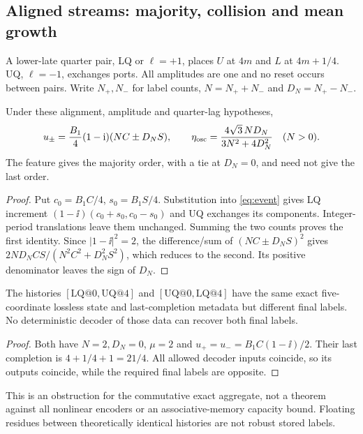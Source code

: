 \subsection{Aligned streams: majority, collision and mean growth}
A lower-late quarter pair, LQ or $\ell=+1$, places $U$ at $4m$ and $L$ at $4m+1/4$. UQ, $\ell=-1$, exchanges ports. All amplitudes are one and no reset occurs between pairs. Write $N_+,N_-$ for label counts, $N=N_++N_-$ and $D_N=N_+-N_-$.

\begin{theorem}\label{thm:majority}
Under these alignment, amplitude and quarter-lag hypotheses,
\begin{equation}\label{eq:majority}
 u_\pm=\frac{B_1}{4}(1-\mathrm i)(NC\pm D_NS),\qquad
 \eta_{\rm osc}=\frac{4\sqrt3\,N D_N}{3N^2+4D_N^2}\quad(N>0).
\end{equation}
The feature gives the majority order, with a tie at $D_N=0$, and need not give the last order.
\end{theorem}
\begin{proof}
Put $c_0=B_1C/4$, $s_0=B_1S/4$. Substitution into \eqref{eq:event} gives LQ increment $(1-\ii)(c_0+s_0,c_0-s_0)$ and UQ exchanges its components. Integer-period translations leave them unchanged. Summing the two counts proves the first identity. Since $|1-\ii|^2=2$, the difference/sum of $(NC\pm D_NS)^2$ gives $2ND_NCS/(N^2C^2+D_N^2S^2)$, which reduces to the second. Its positive denominator leaves the sign of $D_N$.
\end{proof}

\begin{corollary}\label{cor:collision}
The histories $[\mathrm{LQ}@0,\mathrm{UQ}@4]$ and $[\mathrm{UQ}@0,\mathrm{LQ}@4]$ have the same exact five-coordinate lossless state and last-completion metadata but different final labels. No deterministic decoder of those data can recover both final labels.
\end{corollary}
\begin{proof}
Both have $N=2,D_N=0$, $\mu=2$ and $u_+=u_-=B_1C(1-\ii)/2$. Their last completion is $4+1/4+1=21/4$. All allowed decoder inputs coincide, so its outputs coincide, while the required final labels are opposite.
\end{proof}
This is an obstruction for the commutative exact aggregate, not a theorem against all nonlinear encoders or an associative-memory capacity bound. Floating residues between theoretically identical histories are not robust stored labels.

